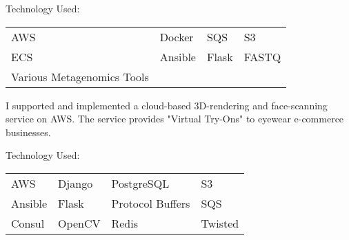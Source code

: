 \documentclass[letterpaper]{deedy-resume} %
\begin{document}
\begin{minipage}[t]{0.66\textwidth}
Technology Used:\\
\begin{tabular}{llll}
AWS & Docker & SQS & S3\\
ECS & Ansible & Flask & FASTQ\\
Various Metagenomics Tools\\
\end{tabular}

\sectionspace %


I supported and implemented a cloud-based 3D-rendering and face-scanning service on AWS. The service provides "Virtual Try-Ons" to eyewear e-commerce businesses.
\sectionspace

Technology Used:\\
\begin{tabular}{llll}
AWS & Django & PostgreSQL & S3\\
Ansible & Flask & Protocol Buffers & SQS\\
Consul & OpenCV & Redis & Twisted\\
\end{tabular}

\sectionspace %






\end{minipage}
\end{document}
